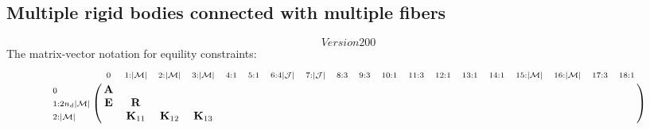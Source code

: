 \documentclass[a4paper,10pt]{article}
\begin{document}
\begin{landscape}
\subsection{Multiple rigid bodies connected with multiple fibers}
\[Version 200\]
The matrix-vector notation for equility constraints:
\begin{equation}\notag
\bordermatrix{
                                        & \scriptstyle{0      }        &   \scriptstyle{1 : |\mathcal{M}|}           &  \scriptstyle{2 : |\mathcal{M}|}           & \scriptstyle{3 : |\mathcal{M}|}            &  \scriptstyle{4 : 1}    & \scriptstyle{5 : 1}    &  \scriptstyle{6:4| \mathcal{J} | }  &  \scriptstyle{7 : | \mathcal{J} |}     &  \scriptstyle{8 : 3} &  \scriptstyle{9:3} & \scriptstyle{10:1}  &  \scriptstyle{11:3}  & \scriptstyle{12:1} & \scriptstyle{13:1}& \scriptstyle{14:1}& \scriptstyle{15:|\mathcal{M}|}& \scriptstyle{16:|\mathcal{M}|}& \scriptstyle{17:3}& \scriptstyle{18:1} \cr
\scriptstyle{0      }                   &\mathbf{A}                    &                                             &                                            &                                            &                         &                        &                                     &                                        &                      &                    &                     &                      &                    &                   &                   &                               &                               &                   &                    \cr
\scriptstyle{1 : 2n_d|\mathcal{M}|}     &\mathbf{E}                    &   \mathbf{R}                                &                                            &                                            &                         &                        &                                     &                                        &                      &                    &                     &                      &                    &                   &                   &                               &                               &                   &                    \cr
\scriptstyle{2 : |\mathcal{M}|}         &                              &   \mathbf{K}_{11}                           &  \mathbf{K}_{12}                           & \mathbf{K}_{13}                            &                         &                        &                                     &                                        &                      &                    &                     &                      &                    &                   &                   &                               &                               &                   &                    \cr
}
\end{equation}
\end{landscape}
\end{document}

